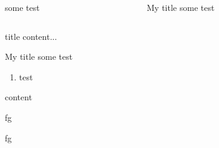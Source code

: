 \documentclass[
]{beamer}
\begin{document}
\begin{frame}
\begin{columns}[onlytextwidth]
\begin{column}{.4\textwidth}
  \begin{block}{}
  some test
  \end{block}  
\end{column}
\begin{column}{.4\textwidth}
  \begin{exampleblock}{My title}
  some test
  \end{exampleblock}   
\end{column}
\end{columns}

\begin{block}{title}
content...

  \begin{alertblock}{My title}
  some test
  \begin{enumerate}
  \item test
  \end{enumerate}
  \end{alertblock} 

content
\end{block}

\begin{tcolorbox}[
  title=foo,
]
fg
\end{tcolorbox}

\begin{tcolorbox}%
fg
\end{tcolorbox}

\end{frame}
\end{document}
